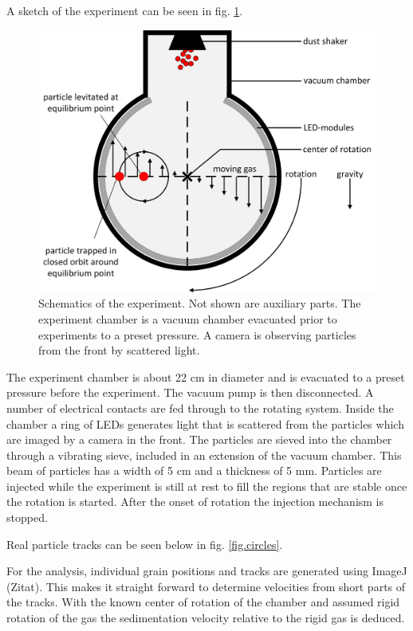 A sketch of the experiment can be seen in fig. \ref{fig.setup}.

\begin{figure}[h]
\includegraphics[width=\columnwidth]{setup.png}
    \caption{\label{fig.setup} Schematics of the experiment. Not shown are auxiliary parts. The experiment chamber is a vacuum chamber evacuated prior to experiments to a preset pressure. A camera is observing particles from the front by scattered light.}
\end{figure}

The experiment chamber is about 22 cm in diameter and is evacuated to a preset pressure before the experiment. The vacuum pump is then disconnected.
A number of electrical contacts are fed through to the rotating system. Inside the chamber a ring of LEDs generates light that
is scattered from the particles which are imaged by a camera in the front.
The particles are sieved into the chamber through a vibrating sieve, included in
an extension of the vacuum chamber. This beam of particles has a width of 5 cm and 
a thickness of 5 mm. Particles are injected while the experiment is still at rest to fill the
regions that are stable once the rotation is started. After the onset of rotation the
injection mechanism is stopped.

Real particle tracks can be seen below in fig. \ref{fig.circles}.

For the analysis, individual grain positions and tracks are generated using ImageJ (Zitat).
This makes it straight forward to determine velocities from short parts of the tracks.
With the known center of rotation of the chamber and assumed rigid rotation of the gas
the sedimentation velocity relative to the rigid gas is deduced.

